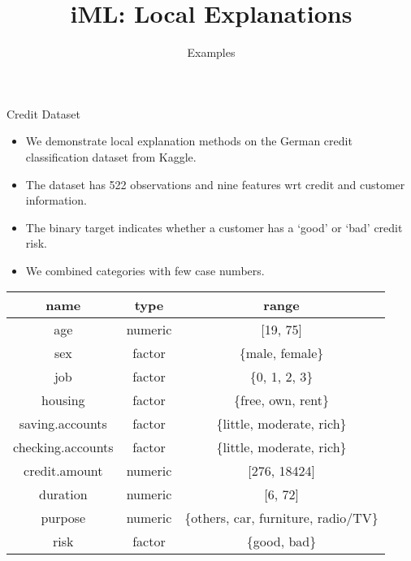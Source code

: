 \documentclass[aspectratio=169]{../latex_main/tntbeamer}  %
\title[Introduction]{iML: Local Explanations}
\subtitle{Examples}
\begin{document}
	
	\maketitle


\begin{frame}{Credit Dataset}
    \vspace{-2em}
	\begin{itemize}
		\item We demonstrate local explanation methods on the German credit classification dataset from Kaggle. \href{https://www.kaggle.com/uciml/german-credit}{}
		\item The dataset has 522 observations and nine features wrt credit and customer information.
		\item The binary target indicates whether a customer has a `good' or `bad' credit risk.  
		\item We combined categories with few case numbers. 
	\end{itemize}
		\begin{center}
			\footnotesize
			\begin{tabular}{ccc}
				\toprule
				name & type & range\\
				\midrule
				age & numeric & [19, 75]\\
				sex & factor & \{male, female\}\\
				job & factor & \{0, 1, 2, 3\}\\
				housing & factor & \{free, own, rent\}\\
				saving.accounts & factor & \{little, moderate, rich\}\\
				checking.accounts & factor & \{little, moderate, rich\}\\
				credit.amount & numeric & [276, 18424]\\
				duration & numeric &  [6, 72]\\
				purpose & numeric &  \{others, car, furniture, radio/TV\}\\
				risk & factor & \{good, bad\}\\
				\bottomrule
			\end{tabular}
		\end{center}
\end{frame}
\end{document}
